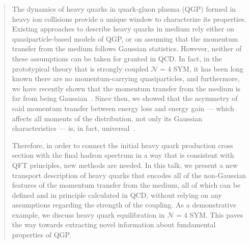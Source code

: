 \documentclass[final,3p,times]{elsarticle}
\begin{document}
\begin{frontmatter}
\begin{abstract}
The dynamics of heavy quarks in quark-gluon plasma (QGP) formed in heavy ion collisions provide a unique window to characterize its properties. Existing approaches to describe heavy quarks in medium rely either on quasiparticle-based models of QGP, or on assuming that the momentum transfer from the medium follows Gaussian statistics. However, neither of these assumptions can be taken for granted in QCD. In fact, in the prototypical theory that is strongly coupled $\mathcal{N}=4$ SYM, it has been long known there are no momentum-carrying quasiparticles, and furthermore, we have recently shown that the momentum transfer from the medium is far from being Gaussian~\cite{Rajagopal:2025ukd}. Since then, we showed that the asymmetry of said momentum transfer between energy loss and energy gain — which affects all moments of the distribution, not only its Gaussian characteristics — is, in fact, universal~\cite{Rajagopal:2025rxr}.

Therefore, in order to connect the initial heavy quark production cross section with the final hadron  spectrum in a way that is consistent with QFT principles, new methods are needed. In this talk, we present a new transport description of heavy quarks that encodes all of the non-Gaussian features of the momentum transfer from the medium, all of which can be defined and in principle calculated in QCD, without relying on any assumptions regarding the strength of the coupling. As a demonstrative example, we discuss heavy quark equilibration in $\mathcal{N}=4$ SYM. This paves the way towards extracting novel information about fundamental properties of QGP.
\end{abstract}



\begin{keyword}



\end{keyword}

\end{frontmatter}
\end{document}
